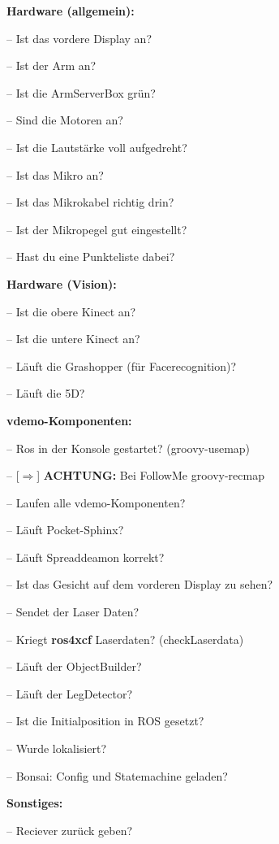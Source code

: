 \documentclass[11pt]{article}
\let\oldmarginpar\marginpar
\renewcommand\marginpar[1]{\-\oldmarginpar[\raggedleft #1]%
{\raggedright #1}}
\newenvironment{checklist}{%
  \begin{list}{}{}%
  \let\olditem\item
  \renewcommand\item{\olditem -- \marginpar{$\Box$} }
  \newcommand\checkeditem{\olditem -- \marginpar{$\CheckedBox$} }
}{%
  \end{list}
}
\begin{document}
\textbf{Hardware (allgemein):}
\begin{checklist}
	\item Ist das vordere Display an?
	\item Ist der Arm an?
	\item Ist die ArmServerBox gr\"un?
	\item Sind die Motoren an?
	\item Ist die Lautst\"arke voll aufgedreht?
	\item Ist das Mikro an?
	\item Ist das Mikrokabel richtig drin?
	\item Ist der Mikropegel gut eingestellt?
	\item Hast du eine Punkteliste dabei?
\end{checklist}
\textbf{Hardware (Vision):}
\begin{checklist}
	\item Ist die obere Kinect an?
	\item Ist die untere Kinect an?
	\item L\"auft die Grashopper (f\"ur Facerecognition)?
	\item L\"auft die 5D?
\end{checklist}	
\textbf{vdemo-Komponenten:}
\begin{checklist}
	\item Ros in der Konsole gestartet? (groovy-usemap)
	\item[$\Rightarrow$] \textbf{ACHTUNG:} Bei FollowMe groovy-recmap
	\item Laufen alle vdemo-Komponenten?
	\item L\"auft Pocket-Sphinx?
	\item L\"auft Spreaddeamon korrekt?
	\item Ist das Gesicht auf dem vorderen Display zu sehen?
	\item Sendet der Laser Daten?
	\item Kriegt \textbf{ros4xcf} Laserdaten? (checkLaserdata)
	\item L\"auft der ObjectBuilder?
	\item L\"auft der LegDetector?
	\item Ist die Initialposition in ROS gesetzt? 
	\item Wurde lokalisiert?
	\item Bonsai: Config und Statemachine geladen?  
\end{checklist}
\textbf{Sonstiges:}
\begin{checklist}
	\item Reciever zur\"uck geben?
\end{checklist}
\end{document}
